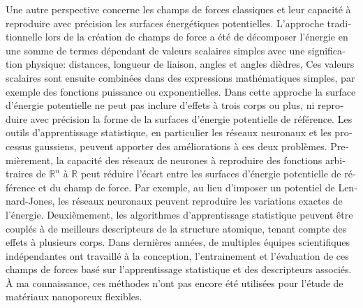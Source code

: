 \documentclass[thesis]{subfiles}
\begin{document}
\begin{otherlanguage}{french}
Une autre perspective concerne les champs de forces classiques et leur capacité
à reproduire avec précision les surfaces énergétiques potentielles. L'approche
traditionnelle lors de la création de champs de force a été de décomposer
l'énergie en une somme de termes dépendant de valeurs scalaires simples avec une
signification physique: distances, longueur de liaison, angles et angles
dièdres, \etc Ces valeurs scalaires sont ensuite combinées dans des
expressions mathématiques simples, par exemple des fonctions puissance ou
exponentielles. Dans cette approche la surface d'énergie potentielle ne peut pas
inclure d'effets à trois corps ou plus, ni reproduire avec précision la forme de
la surfaces d'énergie potentielle de référence. Les outils d'apprentissage
statistique, en particulier les réseaux neuronaux et les processus gaussiens,
peuvent apporter des améliorations à ces deux problèmes. Premièrement, la
capacité des réseaux de neurones à reproduire des fonctions arbitraires de
$\mathds{R}^n$ à $\mathds{R}$ peut réduire l'écart entre les surfaces d'énergie
potentielle de référence et du champ de force. Par exemple, au lieu d'imposer un
potentiel de Lennard-Jones, les réseaux neuronaux peuvent reproduire les
variations exactes de l'énergie. Deuxièmement, les algorithmes d'apprentissage
statistique peuvent être couplés à de meilleurs descripteurs de la structure
atomique, tenant compte des effets à plusieurs corps. Dans dernières années, de
multiples équipes scientifiques indépendantes ont travaillé à la conception,
l'entrainement et l'évaluation de ces champs de forces basé sur l'apprentissage
statistique et des descripteurs associés. À ma connaissance, ces méthodes n'ont
pas encore été utilisées pour l'étude de matériaux nanoporeux flexibles.

\vfill
\begin{center}
\end{center}
\vfill\vfill

\end{otherlanguage}

\OnlyInSubfile{\printglobalbibliography}
\end{document}
